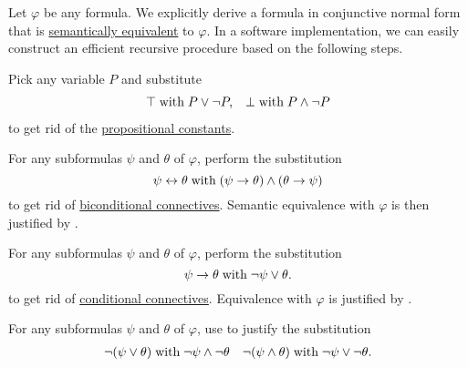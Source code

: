 \begin{algorithm}\label{alg:conjunctive_normal_form_reduction}
  Let \( \varphi \) be any formula. We explicitly derive a formula in conjunctive normal form that is \hyperref[def:propositional_semantics/equivalence]{semantically equivalent} to \( \varphi \). In a software implementation, we can easily construct an efficient recursive procedure based on the following steps.

  \begin{thmenum}
     Pick any variable \( P \) and substitute
    \begin{align*}
      \top \thickspace \text{with} \thickspace P \vee \neg P, && \bot \thickspace \text{with} \thickspace P \wedge \neg P
    \end{align*}
    to get rid of the \hyperref[def:propositional_language/constants]{propositional constants}.

     For any subformulas \( \psi \) and \( \theta \) of \( \varphi \), perform the substitution
    \begin{equation*}
      \psi \leftrightarrow \theta \thickspace \text{with} \thickspace (\psi \rightarrow \theta) \wedge (\theta \rightarrow \psi)
    \end{equation*}
    to get rid of \hyperref[def:propositional_language/connectives/biconditional]{biconditional connectives}. Semantic equivalence with \( \varphi \) is then justified by .

     For any subformulas \( \psi \) and \( \theta \) of \( \varphi \), perform the substitution
    \begin{equation*}
      \psi \rightarrow \theta \thickspace \text{with} \thickspace \neg \psi \vee \theta.
    \end{equation*}
    to get rid of \hyperref[def:propositional_language/connectives/conditional]{conditional connectives}. Equivalence with \( \varphi \) is justified by .

     For any subformulas \( \psi \) and \( \theta \) of \( \varphi \), use  to justify the substitution
    \begin{align*}
      \neg(\psi \vee \theta) \thickspace \text{with} \thickspace \neg \psi \wedge \neg \theta
      &&
      \neg(\psi \wedge \theta) \thickspace \text{with} \thickspace \neg \psi \vee \neg \theta.
    \end{align*}


\end{thmenum}
\end{algorithm}
